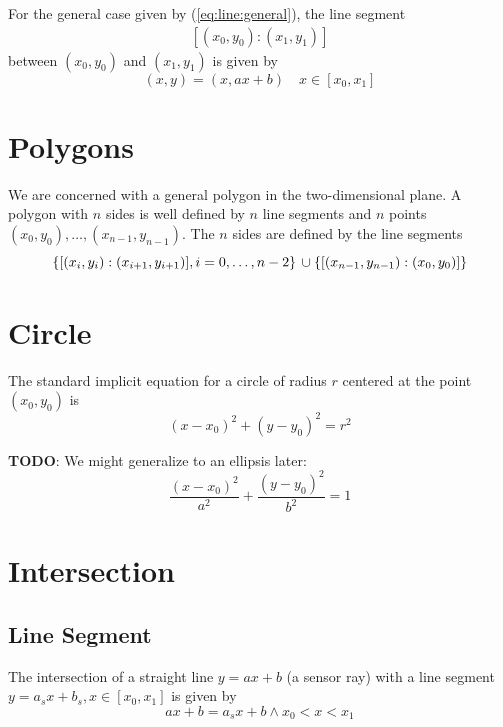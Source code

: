 \documentclass[11pt]{article}
\newcommand{\eqn}[1]{(\ref{#1})}
\newcommand{\TODO}{{\bf TODO}}
\begin{document}
For the general case given by \eqn{eq:line:general}, the line segment 
\begin{gather*}
    \left[(x_0, y_0):(x_1, y_1)\right]
\end{gather*}
between $(x_0, y_0)$ and $(x_1, y_1)$ is given by
\begin{equation}
    (x, y) = (x, ax + b)\quad x\in [x_0, x_1]
\end{equation}

\section{Polygons}
\label{sec:polygons}

We are concerned with a general polygon in the two-dimensional plane. A polygon
with $n$ sides is well defined by $n$ line segments and $n$ points $(x_0,
y_0),\ldots,(x_{n-1}, y_{n-1})$. The $n$ sides are defined by the line segments
\begin{equation}
    \left\{[(x_i, y_i):(x_{i+1}, y_{i+1})], i=0,\ldots,n-2\right\}\\
\cup\left\{[(x_{n-1}, y_{n-1}):(x_{0}, y_{0})]\right\}
\end{equation}

\section{Circle}
\label{sec:circle}

The standard implicit equation for a circle of radius $r$  centered at the 
point $(x_0, y_0)$ is
\begin{equation}
    (x - x_0)^2 + (y - y_0)^2 = r^2 
\end{equation}

\TODO: We might generalize to an ellipsis later:
\begin{equation}
    \frac{(x-x_0)^2}{a^2} + \frac{(y-y_0)^2}{b^2} = 1
\end{equation}

\section{Intersection}
\label{sec:intersection}

\subsection{Line Segment}
\label{sec:intersection:line:segment}
The intersection of a straight line $y=ax+b$ (a sensor ray) with a line segment
$y = a_s x + b_s, x\in[x_0, x_1]$ is given by 
\begin{equation}
    ax+b = a_sx+b \land x_0 < x < x_1
\end{equation}
\end{document}
